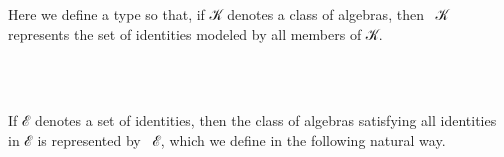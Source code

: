 Here we define a type  so that, if \ab 𝒦 denotes a class of algebras, then ~\ab 𝒦 represents the set of identities modeled by all members of \ab 𝒦.
\ccpad
\begin{code}%
\>[0][@{}l@{\AgdaIndent{1}}]%
\>[1]\AgdaSpace{}%
\AgdaSymbol{:}\AgdaSpace{}%
\AgdaSpace{}%
\AgdaSymbol{(}\AgdaSpace{}%
\AgdaSpace{}%
\AgdaSymbol{)(}\AgdaSpace{}%
\AgdaSymbol{)}\AgdaSpace{}%
\AgdaSpace{}%
\AgdaSymbol{(}\AgdaSpace{}%
\AgdaSpace{}%
\AgdaSpace{}%
\AgdaSpace{}%
\AgdaSymbol{)(}\AgdaSpace{}%
\AgdaSpace{}%
\AgdaSpace{}%
\AgdaSymbol{)}\<%
\\
%
\\[\AgdaEmptyExtraSkip]%
%
\>[1]\AgdaSpace{}%
\AgdaSpace{}%
\AgdaSymbol{=}\AgdaSpace{}%
\AgdaSpace{}%
\AgdaSymbol{(}\AgdaSpace{}%
\AgdaOperator{\AgdaInductiveConstructor{,}}\AgdaSpace{}%
\AgdaSymbol{)}\AgdaSpace{}%
\AgdaSpace{}%
\AgdaSpace{}%
\AgdaSpace{}%
\AgdaSpace{}%
\AgdaSpace{}%
\<%
\end{code}
\ccpad
If \ab ℰ denotes a set of identities, then the class of algebras satisfying all identities in \ab ℰ is represented by ~\ab ℰ, which we define in the following natural way.
\ccpad
\begin{code}%
\>[0][@{}l@{\AgdaIndent{1}}]%
\>[1]\AgdaSpace{}%
\AgdaSymbol{:}\AgdaSpace{}%
\AgdaSymbol{(}\AgdaSpace{}%
\AgdaSpace{}%
\AgdaSpace{}%
\AgdaSpace{}%
\AgdaSymbol{)(}\AgdaSpace{}%
\AgdaSpace{}%
\AgdaSpace{}%
\AgdaSymbol{)}\AgdaSpace{}%
\AgdaSpace{}%
\AgdaSymbol{(}\AgdaSpace{}%
\AgdaSpace{}%
\AgdaSymbol{)(}\AgdaSpace{}%
\AgdaSymbol{(}\AgdaSpace{}%
\AgdaSpace{}%
\AgdaSymbol{))}\<%
\\
%
\\[\AgdaEmptyExtraSkip]%
%
\>[1]\AgdaSpace{}%
\AgdaSpace{}%
\AgdaSymbol{=}\AgdaSpace{}%
\AgdaSpace{}%
\AgdaSpace{}%
\AgdaSpace{}%
\AgdaSpace{}%
\AgdaSpace{}%
\AgdaSpace{}%
\AgdaSpace{}%
\AgdaSymbol{(}\AgdaSpace{}%
\AgdaOperator{\AgdaInductiveConstructor{,}}\AgdaSpace{}%
\AgdaSymbol{)}\AgdaSpace{}%
\AgdaSpace{}%
\AgdaSpace{}%
\AgdaSpace{}%
\AgdaSpace{}%
\AgdaSpace{}%
\AgdaSpace{}%
\AgdaSpace{}%
\<%
\end{code}

